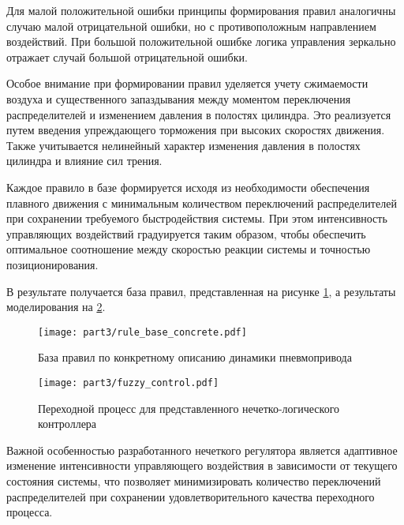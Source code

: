 Для малой положительной ошибки принципы формирования правил
аналогичны случаю малой отрицательной ошибки, но с противоположным
направлением воздействий. При большой положительной ошибке
логика управления зеркально отражает случай большой отрицательной ошибки.

Особое внимание при формировании правил уделяется учету сжимаемости
воздуха и существенного запаздывания между моментом переключения
распределителей и изменением давления в полостях цилиндра. Это
реализуется путем введения упреждающего торможения при высоких
скоростях движения. Также учитывается нелинейный характер изменения
давления в полостях цилиндра и влияние сил трения.

Каждое правило в базе формируется исходя из необходимости
обеспечения плавного движения с минимальным количеством
переключений распределителей при сохранении требуемого
быстродействия системы. При этом интенсивность управляющих
воздействий градуируется таким образом, чтобы обеспечить
оптимальное соотношение между скоростью реакции системы и
точностью позиционирования.

В результате получается база правил, представленная на рисунке \ref{fig:concrette_fuzzy_rules}, а результаты моделирования на \ref{fig:fuzzy_transient}.

\begin{figure}[ht]
	\centering
	\texttt{[image: part3/rule\_base\_concrete.pdf]}
	\caption{База правил по конкретному описанию динамики пневмопривода}
	\label{fig:concrette_fuzzy_rules}
\end{figure}

\begin{figure}[ht]
	\centering
	\texttt{[image: part3/fuzzy\_control.pdf]}
	\caption{Переходной процесс для представленного нечетко-логического контроллера }
	\label{fig:fuzzy_transient}
\end{figure}

Важной особенностью разработанного нечеткого регулятора является адаптивное изменение интенсивности управляющего
воздействия в зависимости от текущего состояния системы, что позволяет минимизировать количество переключений распределителей при
сохранении удовлетворительного качества переходного процесса.
